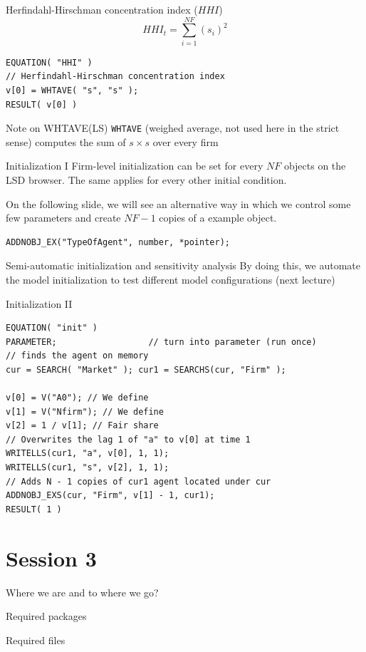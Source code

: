 \documentclass[bigger,aspectratio=169]{beamer}
\begin{document}
\begin{frame}[label={sec:org4a2badb},fragile]{Herfindahl-Hirschman concentration index (\(HHI\))}
 \begin{equation}
HHI_{t} = \sum_{i=1}^{NF} (s_{i})^2
\end{equation}


\begin{verbatim}
EQUATION( "HHI" )
// Herfindahl-Hirschman concentration index
v[0] = WHTAVE( "s", "s" );
RESULT( v[0] )
\end{verbatim}
\begin{block}{Note on WHTAVE(LS)}
\texttt{WHTAVE} (weighed average, not used here in the strict sense) computes the sum of \(s\times s\) over every firm
\end{block}
\end{frame}
\begin{frame}[label={sec:org7c1c948},fragile]{Initialization I}
 Firm-level initialization can be set for every \(NF\) objects on the LSD browser.
The same applies for every other initial condition.

On the following slide, we will see an alternative way in which we control some few parameters and create \(NF-1\) copies of a example object.

\begin{verbatim}
ADDNOBJ_EX("TypeOfAgent", number, *pointer);
\end{verbatim}
\begin{block}{Semi-automatic initialization and sensitivity analysis}
By doing this, we automate the model initialization to test different model configurations (next lecture)
\end{block}
\end{frame}
\begin{frame}[label={sec:org2089fd5},fragile]{Initialization II}
 \begin{verbatim}
EQUATION( "init" )
PARAMETER;                  // turn into parameter (run once)
// finds the agent on memory
cur = SEARCH( "Market" ); cur1 = SEARCHS(cur, "Firm" );

v[0] = V("A0"); // We define
v[1] = V("Nfirm"); // We define
v[2] = 1 / v[1]; // Fair share
// Overwrites the lag 1 of "a" to v[0] at time 1
WRITELLS(cur1, "a", v[0], 1, 1);
WRITELLS(cur1, "s", v[2], 1, 1);
// Adds N - 1 copies of cur1 agent located under cur
ADDNOBJ_EXS(cur, "Firm", v[1] - 1, cur1);
RESULT( 1 )
\end{verbatim}
\end{frame}
\section{Session 3}
\label{sec:orgec1dc36}

\begin{frame}[label={sec:org5c2dc09}]{Where we are and to where we go?}
\end{frame}

\begin{frame}[label={sec:orged35054}]{Required packages}
\end{frame}

\begin{frame}[label={sec:orgc36da0d}]{Required files}
\end{frame}
\end{document}
